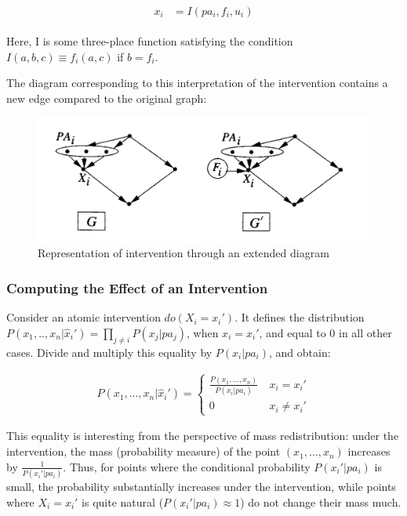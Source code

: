 \documentclass[fleqn]{article}
\numberwithin{equation}{section}
\numberwithin{theorem}{section}
\numberwithin{figure}{section}
\numberwithin{lemma}{section}
\numberwithin{corollary}{section}
\begin{document}
\begin{align}
	\begin{split}
		x_i &= I(pa_i, f_i, u_i)
	\end{split}
\end{align}

Here, I is some three-place function satisfying the condition $I(a,b,c) \equiv f_i(a,c)$ if $b = f_i$.

The diagram corresponding to this interpretation of the intervention contains a new edge compared to the original graph:

\begin{figure}[h]
	\begin{center}
		\includegraphics[scale=0.6]{imgs/img19.png}
	\end{center}
	\caption{Representation of intervention through an extended diagram}
	\label{fig:explicit_intervention_in_graph}
\end{figure}

\subsubsection*{Computing the Effect of an Intervention}

Consider an atomic intervention $do(X_i = x_i')$. It defines the distribution $P(x_1,..,x_n|\hat x_i') = \prod\limits_{j\neq i}P(x_j | pa_j)$, when $x_i = x_i'$, and equal to 0 in all other cases. Divide and multiply this equality by $P(x_i | pa_i)$, and obtain:

\begin{align}
	P(x_1,...,x_n|\hat x_i') = \begin{cases}
		\frac{P(x_1,...,x_n)}{P(x_i | pa_i)} & \ x_i = x_i'\\
		0 & \ x_i \neq x_i'
	\end{cases}
	\label{eq:intervention}
\end{align}

This equality is interesting from the perspective of mass redistribution: under the intervention, the mass (probability measure) of the point $(x_1, ..., x_n)$ increases by $\frac{1}{P(x_i' | pa_i)}$. Thus, for points where the conditional probability $P(x_i'|pa_i)$ is small, the probability substantially increases under the intervention, while points where $X_i = x_i'$ is quite natural ($P(x_i'|pa_i) \approx 1$) do not change their mass much.
\end{document}
